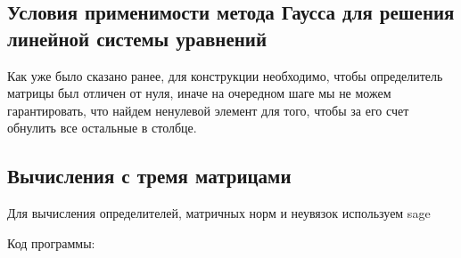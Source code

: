 \documentclass{article}
\theoremstyle{definition}
\theoremstyle{remark}
\begin{document}
\subsection{Условия применимости метода Гаусса для решения линейной системы уравнений}

Как уже было сказано ранее, для конструкции необходимо, чтобы определитель матрицы был отличен от нуля, иначе на очередном шаге мы не можем гарантировать, что найдем ненулевой элемент для того, чтобы за его счет обнулить все остальные в столбце.

\subsection{Вычисления с тремя матрицами}

Для вычисления определителей, матричных норм и неувязок используем sage

Код программы:
\end{document}
